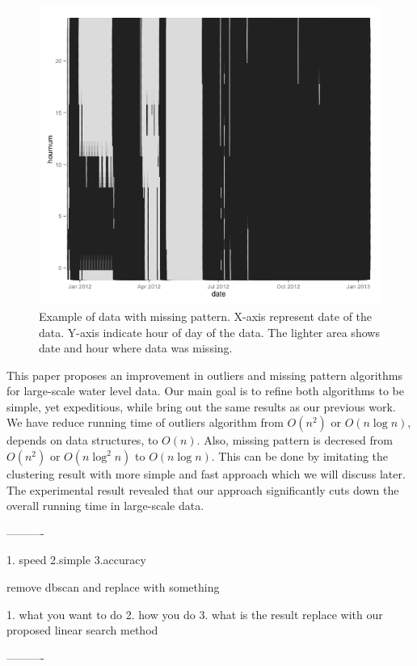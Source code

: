 \documentclass[conference]{IEEEtran}
\begin{document}
\begin{figure}
	\includegraphics[width=\linewidth]{figure3.png}
	\caption{Example of data with missing pattern. X-axis represent date of the data. Y-axis indicate hour of day of the data. The lighter area shows date and hour where data was missing.}
	\label{fig:example_missingpattern}
\end{figure}

{\color{red}
This paper proposes an improvement in outliers and missing pattern algorithms for large-scale water level data. Our main goal is to refine both algorithms to be simple, yet expeditious, while bring out the same results as our previous work. We have reduce running time of outliers algorithm from $O(n^2)$ or $O(n \log{n})$, depends on data structures, to $O(n)$. Also, missing pattern is decresed from $O(n^2)$ or $O(n \log^2{n})$ to $O(n \log{n})$. This can be  done by imitating the clustering result with more simple and fast approach which we will discuss later. The experimental result revealed that our approach significantly cuts down the overall running time in large-scale data.
}

----------

1. speed 2.simple 3.accuracy

remove dbscan and replace with something

1. what you want to do 2. how you do 3. what is the result
replace with our proposed linear search method

----------
\end{document}
